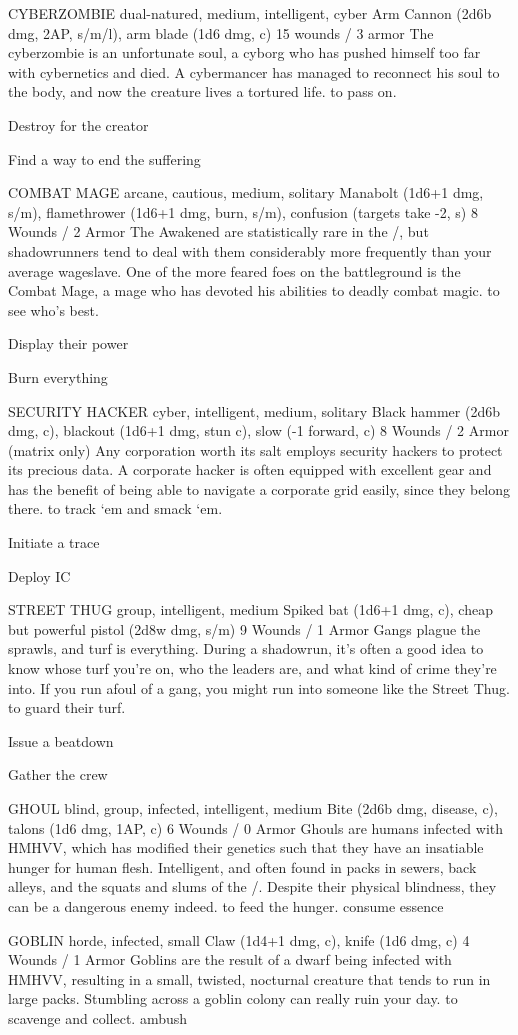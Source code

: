 \documentclass[oneside,10pt]{article}
\begin{document}
\begin{multicols}{2}
\critterspec
{CYBERZOMBIE	}
{dual-natured, medium, intelligent, cyber}
{Arm Cannon (2d6b dmg, 2AP, s/m/l), arm blade (1d6 dmg, c)}
{15 wounds / 3 armor}
{The cyberzombie is an unfortunate soul, a cyborg who has pushed himself too far with cybernetics and died. A cybermancer has managed to reconnect his soul to the body, and now the creature lives a tortured life. }
{to pass on.}
{\tcirc{} Destroy for the creator

\tcirc{} Find a way to end the suffering}


\critterspec
{COMBAT MAGE	}
{arcane, cautious, medium, solitary}
{Manabolt (1d6+1 dmg, s/m), flamethrower (1d6+1 dmg, burn, s/m), confusion (targets take -2, s)}
{8 Wounds / 2 Armor}
{The Awakened are statistically rare in the \SW/, but shadowrunners tend to deal with them considerably more frequently than your average wageslave. One of the more feared foes on the battleground is the Combat Mage, a mage who has devoted his abilities to deadly combat magic.} 
{to see who’s best.}
{\tcirc{} Display their power

\tcirc{} Burn everything}

\critterspec
{SECURITY HACKER	}
{cyber, intelligent, medium, solitary}
{Black hammer (2d6b dmg, c), blackout (1d6+1 dmg, stun c), slow (-1 forward, c)}
{8 Wounds / 2 Armor (matrix only)}
{Any corporation worth its salt employs security hackers to protect its precious data. A corporate hacker is often equipped with excellent gear and has the benefit of being able to navigate a corporate grid easily, since they belong there.}
{to track ‘em and smack ‘em.}
{\tcirc{} Initiate a trace

\tcirc{} Deploy IC}

\critterspec
{STREET THUG}
{group, intelligent, medium}
{Spiked bat (1d6+1 dmg, c), cheap but powerful pistol (2d8w dmg, s/m)}
{9 Wounds / 1 Armor}
{Gangs plague the sprawls, and turf is everything. During a shadowrun, it’s often a good idea to know whose turf you’re on, who the leaders are, and what kind of crime they’re into. If you run afoul of a gang, you might run into someone like the Street Thug.}
{to guard their turf.}
{\tcirc{} Issue a beatdown

\tcirc{} Gather the crew
}

\critterspec
{GHOUL}
{blind, group, infected, intelligent, medium}
{Bite (2d6b dmg, disease, c), talons (1d6 dmg, 1AP, c)}
{6 Wounds / 0 Armor}
{Ghouls are humans infected with HMHVV, which has modified their genetics such that they have an insatiable hunger for human flesh. Intelligent, and often found in packs in sewers, back alleys, and the squats and slums of the \SW/. Despite their physical blindness, they can be a dangerous enemy indeed.}
{to feed the hunger.}
{\tcirc{} consume essence}

\critterspec
{GOBLIN	}
{horde, infected, small}
{Claw (1d4+1 dmg, c), knife (1d6 dmg, c)}
{4 Wounds / 1 Armor}
{Goblins are the result of a dwarf being infected with HMHVV, resulting in a small, twisted, nocturnal creature that tends to run in large packs. Stumbling across a goblin colony can really ruin your day.}
{to scavenge and collect.}
{\tcirc{} ambush}

\end{multicols}
\end{document}

